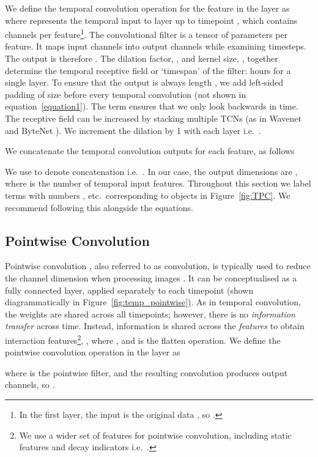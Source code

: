 \documentclass[sigconf]{acmart}
\begin{document}
We define the temporal convolution operation for the  feature in the  layer as 
where  represents the temporal input to layer  up to timepoint , which contains  channels per feature\footnote{In the first layer, the input  is the original data , so .}.
The convolutional filter  is a tensor of  parameters per feature. It maps  input channels into  output channels while examining  timesteps. The output is therefore . 
The dilation factor, , and kernel size, , together determine the temporal receptive field or `timespan' of the filter:  hours for a single layer. To ensure that the output is always length , we add left-sided padding of size  before every temporal convolution (not shown in equation~\ref{equation1}). The  term ensures that we only look backwards in time. The receptive field can be increased by stacking multiple TCNs (as in Wavenet \citep{Simonyan2016} and ByteNet \citep{DBLP:journals/corr/KalchbrennerESO16}). We increment the dilation by 1 with each layer i.e.\ .

We concatenate the temporal convolution outputs for each feature,  as follows

We use  to denote concatenation i.e.\ . In our case, the output dimensions are , where  is the number of temporal input features. Throughout this section we label terms with numbers ,  etc.\ corresponding to objects in Figure~\ref{fig:TPC}. We recommend following this alongside the equations.

\subsection{Pointwise Convolution}
Pointwise convolution \citep{lin2013network}, also referred to as  convolution, is typically used to reduce the channel dimension when processing images \citep{DBLP:journals/corr/SzegedyLJSRAEVR14}. It can be conceptualised as a fully connected layer, applied separately to each timepoint (shown diagrammatically in Figure~\ref{fig:temp_pointwise}). As in temporal convolution, the weights are shared across all timepoints; however, there is no \textit{information transfer} across time. Instead, information is shared across the \textit{features} to obtain  interaction features\footnote{We use a wider set of features for pointwise convolution, including static features  and decay indicators  i.e.\ .}, , where , and  is the flatten operation. We define the pointwise convolution operation in the  layer as

where  is the pointwise filter, and the resulting convolution produces  output channels, so .
\end{document}
